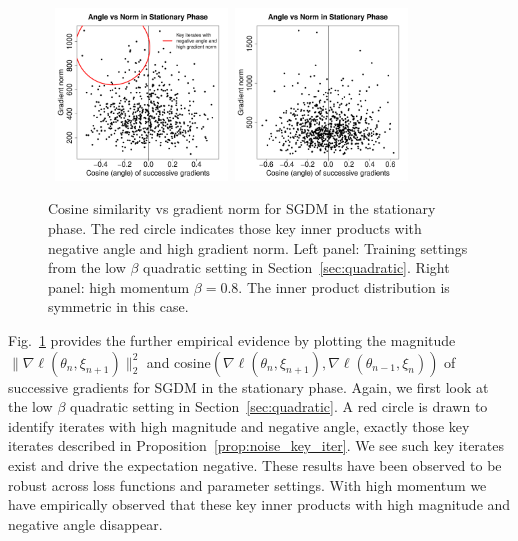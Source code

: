 \documentclass[conference]{IEEEtran}
\begin{document}
\begin{figure}[h]
\mbox{
  \includegraphics[width=1.8in]{fig/4-2_AngleNorm.pdf}\hspace{-0.12in}
  \includegraphics[width=1.8in]{fig/RFig7_HMAN.pdf}
}
\vspace{-0.2in}
  \caption{Cosine similarity vs gradient norm for SGDM in the stationary phase.
  The red circle indicates those key inner products with negative angle and high gradient norm.
  Left panel: Training settings from the low $\beta$ quadratic setting in Section~\ref{sec:quadratic}.
  Right panel: high momentum $\beta = 0.8$.
  The inner product distribution is symmetric in this case. 
  }
  \label{fig:angle_norm}
\end{figure}




Fig.~\ref{fig:angle_norm} provides the further empirical evidence  by plotting the magnitude $\| \nabla \ell (\theta_n, \xi_{n+1}) \|_2^2$ and  cosine$(\nabla \ell (\theta_n, \xi_{n+1}), \nabla \ell (\theta_{n-1}, \xi_{n}) )$ of successive gradients for SGDM in the stationary phase. Again, we first look at the low $\beta$ quadratic setting in Section~\ref{sec:quadratic}. A red circle is drawn to identify iterates with high magnitude and negative angle, exactly those key iterates described in Proposition~\ref{prop:noise_key_iter}. 
We see such key iterates exist and drive the expectation negative.  
These results have been observed to be robust across loss functions and parameter settings.  With high momentum we have empirically observed that these key inner products with high magnitude and negative angle disappear.
\end{document}
